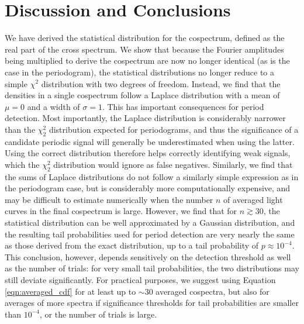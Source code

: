 \documentclass[12pt]{emulateapj}
\begin{document}
\section{Discussion and Conclusions}
\label{sec:discussion}
We have derived the statistical distribution for the cospectrum, defined as the real part of the cross spectrum. We show that because the Fourier amplitudes being multiplied to derive the cospectrum are now no longer identical (as is the case in the periodogram), the statistical distributions no longer reduce to a simple $\chi^2$ distribution with two degrees of freedom. Instead, we find that the densities in a single cospectrum follow a Laplace distribution with a mean of $\mu=0$ and a width of $\sigma=1$. This has important consequences for period detection. Most importantly, the Laplace distribution is considerably narrower than the $\chi^2_2$ distribution expected for periodograms, and thus the significance of a candidate periodic signal will generally be underestimated when using the latter. Using the correct distribution therefore helps correctly identifying weak signals, which the $\chi^2_2$ distribution would ignore as false negatives. 
Similarly, we find that the sums of Laplace distributions do not follow a similarly simple expression as in the periodogram case, but is considerably more computationally expensive, and may be difficult to estimate numerically when the number $n$ of averaged light curves in the final cospectrum is large. However, we find that for $n \gtrsim 30$, the statistical distribution can be well approximated by a Gaussian distribution, and the resulting tail probabilities used for period detection are very nearly the same as those derived from the exact distribution, up to a tail probability of $p \approx 10^{-4}$. This conclusion, however, depends sensitively on the detection threshold as well as the number of trials: for very small tail probabilities, the two distributions may still deviate significantly. For practical purposes, we suggest using Equation \ref{eqn:averaged_cdf} for at least up to $\sim$30 averaged cospectra, but also for averages of more spectra if significance thresholds for tail probabilities are smaller than $10^{-4}$, or the number of trials is large. 
\end{document}
